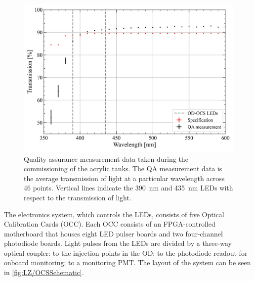 \begin{figure}[!h]
    \centering
    \includegraphics[width=0.7\linewidth]{figures/LZ/T187-XDM-UVT_WAVELENGHT_08252017.png}
    \caption[Quality assurance measurement data taken during the commissioning of the acrylic tanks.]{Quality assurance measurement data taken during the commissioning of the acrylic tanks. The QA measurement data is the average transmission of light at a particular wavelength across 46 points. Vertical lines indicate the 390~nm and 435~nm LEDs with respect to the transmission of light.}
    \label{fig:LZ/AcrylicQA}
\end{figure}

The electronics system, which controls the LEDs, consists of five Optical Calibration Cards (OCC). Each OCC consists of an FPGA-controlled motherboard that houses eight LED pulser boards and two four-channel photodiode boards. Light pulses from the LEDs are divided by a three-way optical coupler: to the injection points in the OD; to the photodiode readout for onboard monitoring; to a monitoring PMT. The layout of the system can be seen in \autoref{fig:LZ/OCSSchematic}.

